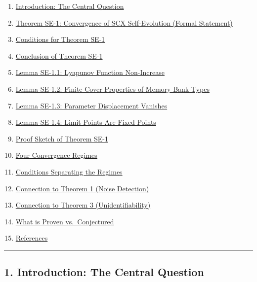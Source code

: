 \documentclass[
  12pt,
]{article}
\providecommand{\tightlist}{%
  \setlength{\itemsep}{0pt}\setlength{\parskip}{0pt}}
\begin{document}
\begin{enumerate}
\def\labelenumi{\arabic{enumi}.}
\tightlist
\item
  \hyperref[1-introduction-the-central-question]{Introduction: The
  Central Question}
\item
  \hyperref[2-theorem-se-1-convergence-of-scx-self-evolution-formal-statement]{Theorem
  SE-1: Convergence of SCX Self-Evolution (Formal Statement)}
\item
  \hyperref[3-conditions-for-theorem-se-1]{Conditions for Theorem SE-1}
\item
  \hyperref[4-conclusion-of-theorem-se-1]{Conclusion of Theorem SE-1}
\item
  \hyperref[5-lemma-se-11-lyapunov-function-non-increase]{Lemma SE-1.1:
  Lyapunov Function Non-Increase}
\item
  \hyperref[6-lemma-se-12-finite-cover-properties-of-memory-bank-types]{Lemma
  SE-1.2: Finite Cover Properties of Memory Bank Types}
\item
  \hyperref[7-lemma-se-13-parameter-displacement-vanishes]{Lemma SE-1.3:
  Parameter Displacement Vanishes}
\item
  \hyperref[8-lemma-se-14-limit-points-are-fixed-points]{Lemma SE-1.4:
  Limit Points Are Fixed Points}
\item
  \hyperref[9-proof-sketch-of-theorem-se-1]{Proof Sketch of Theorem
  SE-1}
\item
  \hyperref[10-four-convergence-regimes]{Four Convergence Regimes}
\item
  \hyperref[11-conditions-separating-the-regimes]{Conditions Separating
  the Regimes}
\item
  \hyperref[12-connection-to-theorem-1-noise-detection]{Connection to
  Theorem 1 (Noise Detection)}
\item
  \hyperref[13-connection-to-theorem-3-unidentifiability]{Connection to
  Theorem 3 (Unidentifiability)}
\item
  \hyperref[14-what-is-proven-vs-conjectured]{What is Proven
  vs.~Conjectured}
\item
  \hyperref[15-references]{References}
\end{enumerate}

\begin{center}\rule{0.5\linewidth}{0.5pt}\end{center}

\subsection{1. Introduction: The Central
Question}\label{introduction-the-central-question}
\end{document}
